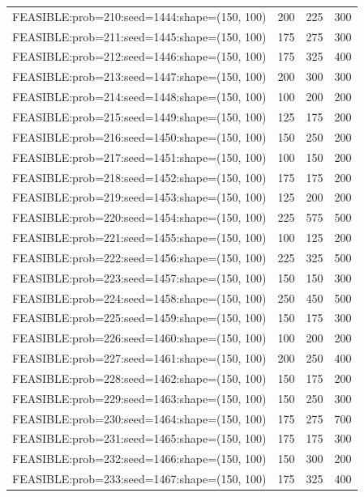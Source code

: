\begin{longtable}{lccc}
FEASIBLE:prob=210:seed=1444:shape=(150, 100) &  200 &   225 &    300 \\
FEASIBLE:prob=211:seed=1445:shape=(150, 100) &  175 &   275 &    300 \\
FEASIBLE:prob=212:seed=1446:shape=(150, 100) &  175 &   325 &    400 \\
FEASIBLE:prob=213:seed=1447:shape=(150, 100) &  200 &   300 &    300 \\
FEASIBLE:prob=214:seed=1448:shape=(150, 100) &  100 &   200 &    200 \\
FEASIBLE:prob=215:seed=1449:shape=(150, 100) &  125 &   175 &    200 \\
FEASIBLE:prob=216:seed=1450:shape=(150, 100) &  150 &   250 &    200 \\
FEASIBLE:prob=217:seed=1451:shape=(150, 100) &  100 &   150 &    200 \\
FEASIBLE:prob=218:seed=1452:shape=(150, 100) &  175 &   175 &    200 \\
FEASIBLE:prob=219:seed=1453:shape=(150, 100) &  125 &   200 &    200 \\
FEASIBLE:prob=220:seed=1454:shape=(150, 100) &  225 &   575 &    500 \\
FEASIBLE:prob=221:seed=1455:shape=(150, 100) &  100 &   125 &    200 \\
FEASIBLE:prob=222:seed=1456:shape=(150, 100) &  225 &   325 &    500 \\
FEASIBLE:prob=223:seed=1457:shape=(150, 100) &  150 &   150 &    300 \\
FEASIBLE:prob=224:seed=1458:shape=(150, 100) &  250 &   450 &    500 \\
FEASIBLE:prob=225:seed=1459:shape=(150, 100) &  150 &   175 &    300 \\
FEASIBLE:prob=226:seed=1460:shape=(150, 100) &  100 &   200 &    200 \\
FEASIBLE:prob=227:seed=1461:shape=(150, 100) &  200 &   250 &    400 \\
FEASIBLE:prob=228:seed=1462:shape=(150, 100) &  150 &   175 &    200 \\
FEASIBLE:prob=229:seed=1463:shape=(150, 100) &  150 &   250 &    300 \\
FEASIBLE:prob=230:seed=1464:shape=(150, 100) &  175 &   275 &    700 \\
FEASIBLE:prob=231:seed=1465:shape=(150, 100) &  175 &   175 &    300 \\
FEASIBLE:prob=232:seed=1466:shape=(150, 100) &  150 &   300 &    200 \\
FEASIBLE:prob=233:seed=1467:shape=(150, 100) &  175 &   325 &    400 \\

\end{longtable}

